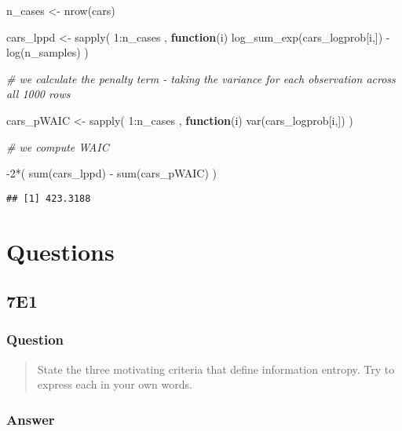 \documentclass[
]{book}
\newenvironment{Shaded}{\begin{snugshade}}{\end{snugshade}}
\newcommand{\CommentTok}[1]{\textcolor[rgb]{0.56,0.35,0.01}{\textit{#1}}}
\newcommand{\ControlFlowTok}[1]{\textcolor[rgb]{0.13,0.29,0.53}{\textbf{#1}}}
\newcommand{\DecValTok}[1]{\textcolor[rgb]{0.00,0.00,0.81}{#1}}
\newcommand{\FunctionTok}[1]{\textcolor[rgb]{0.00,0.00,0.00}{#1}}
\newcommand{\NormalTok}[1]{#1}
\newcommand{\OtherTok}[1]{\textcolor[rgb]{0.56,0.35,0.01}{#1}}
\newcommand{\SpecialCharTok}[1]{\textcolor[rgb]{0.00,0.00,0.00}{#1}}
\begin{document}
\begin{Shaded}
\begin{Highlighting}[]
\NormalTok{n\_cases }\OtherTok{\textless{}{-}} \FunctionTok{nrow}\NormalTok{(cars) }

\NormalTok{cars\_lppd }\OtherTok{\textless{}{-}} \FunctionTok{sapply}\NormalTok{( }\DecValTok{1}\SpecialCharTok{:}\NormalTok{n\_cases , }\ControlFlowTok{function}\NormalTok{(i) }\FunctionTok{log\_sum\_exp}\NormalTok{(cars\_logprob[i,]) }\SpecialCharTok{{-}} \FunctionTok{log}\NormalTok{(n\_samples) )}

\CommentTok{\# we calculate the penalty term {-} taking the variance for each observation across all 1000 rows}

\NormalTok{cars\_pWAIC }\OtherTok{\textless{}{-}} \FunctionTok{sapply}\NormalTok{( }\DecValTok{1}\SpecialCharTok{:}\NormalTok{n\_cases , }\ControlFlowTok{function}\NormalTok{(i) }\FunctionTok{var}\NormalTok{(cars\_logprob[i,]) )}

\CommentTok{\# we compute WAIC}

\SpecialCharTok{{-}}\DecValTok{2}\SpecialCharTok{*}\NormalTok{( }\FunctionTok{sum}\NormalTok{(cars\_lppd) }\SpecialCharTok{{-}} \FunctionTok{sum}\NormalTok{(cars\_pWAIC) )}
\end{Highlighting}
\end{Shaded}

\begin{verbatim}
## [1] 423.3188
\end{verbatim}

\hypertarget{questions-6}{%
\section{Questions}\label{questions-6}}

\hypertarget{e1-5}{%
\subsection*{7E1}\label{e1-5}}

\hypertarget{question-60}{%
\subsubsection*{Question}\label{question-60}}

\begin{quote}
State the three motivating criteria that define information entropy. Try to express each in your own words.
\end{quote}

\hypertarget{answer-60}{%
\subsubsection*{Answer}\label{answer-60}}
\end{document}
